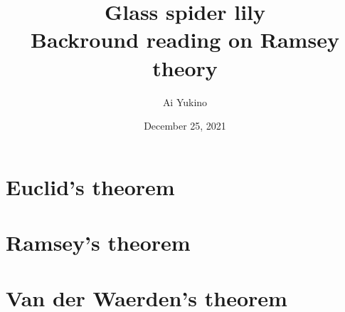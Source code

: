 \documentclass{article}
\begin{document}
\title{Glass spider lily\\
	\large Backround reading on Ramsey theory}
\author{Ai Yukino}
\date{December 25, 2021}
\maketitle
\hypersetup{linkcolor = internallinkcolor}
\tableofcontents
\hypersetup{linkcolor= .}

\section{Euclid's theorem}

\section{Ramsey's theorem}

\section{Van der Waerden's theorem}
\end{document}
